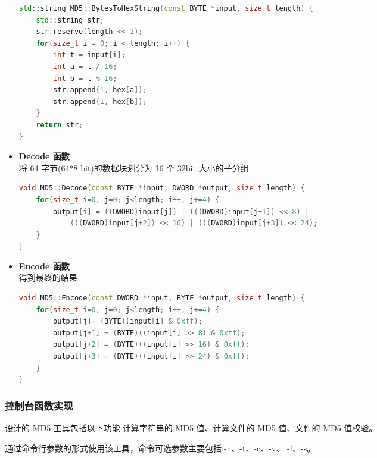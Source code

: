 \documentclass[UTF8,a4paper,10pt]{ctexart}
\begin{document}
\begin{itemize}
\begin{lstlisting}[language = C++]
std::string MD5::BytesToHexString(const BYTE *input, size_t length) {
	std::string str;
	str.reserve(length << 1);
	for(size_t i = 0; i < length; i++) {
		int t = input[i];
		int a = t / 16;
		int b = t % 16;
		str.append(1, hex[a]);
		str.append(1, hex[b]);
	}
	return str;
}
    \end{lstlisting}


    \item \textbf{Decode 函数}\\
    将 64 字节(64*8 bit)的数据块划分为 16 个 32bit 大小的子分组
    \begin{lstlisting}[language = C++]
void MD5::Decode(const BYTE *input, DWORD *output, size_t length) {
    for(size_t i=0, j=0; j<length; i++, j+=4) {	
        output[i] = ((DWORD)input[j]) | (((DWORD)input[j+1]) << 8) |
            (((DWORD)input[j+2]) << 16) | (((DWORD)input[j+3]) << 24);
    }
}
    \end{lstlisting}

    \item \textbf{Encode 函数}\\ 
    得到最终的结果
    \begin{lstlisting}[language = C++]
void MD5::Encode(const DWORD *input, BYTE *output, size_t length) {
	for(size_t i=0, j=0; j<length; i++, j+=4) {
		output[j]= (BYTE)(input[i] & 0xff);
		output[j+1] = (BYTE)((input[i] >> 8) & 0xff);
		output[j+2] = (BYTE)((input[i] >> 16) & 0xff);
		output[j+3] = (BYTE)((input[i] >> 24) & 0xff);
	}
}
    \end{lstlisting}
\end{itemize}
\subsubsection{控制台函数实现}
设计的 MD5 工具包括以下功能:计算字符串的 MD5 值、计算文件的 MD5 值、文件的 MD5 值校验。

通过命令行参数的形式使用该工具，命令可选参数主要包括:-h、-t、-c、-v、 -f、-s。
\end{document}
